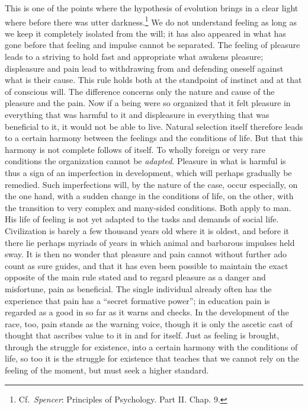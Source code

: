 \documentclass[12pt,a4paper]{book}
\newcommand{\opage}[1]{\marginnote{\footnotesize\textit{[#1]}}}
\begin{document}
This is one of the points where the hypothesis of evolution brings in a
clear light where before there was utter
darkness.\footnote{Cf.\ \emph{Spencer}: Principles of Psychology. Part
II. Chap. 9.} We do not understand feeling as long as we keep it
completely isolated from the will; it has also appeared in what has gone
before that feeling and impulse cannot be separated. The feeling of
pleasure leads to a striving to hold fast and appropriate what awakens
pleasure; displeasure and pain lead to withdrawing from and defending
oneself against what is their cause. This rule holds both at the
standpoint of instinct and at that of conscious will. The difference
\opage{325}concerns only the nature and cause of the pleasure and the
pain. Now if a being were so organized that it felt pleasure in
everything that was harmful to it and displeasure in everything that was
beneficial to it, it would not be able to live. Natural selection itself
therefore leads to a certain harmony between the feelings and the
conditions of life. But that this harmony is not complete follows of
itself. To wholly foreign or very rare conditions the organization
cannot be \emph{adapted}. Pleasure in what is harmful is thus a sign of
an imperfection in development, which will perhaps gradually be
remedied. Such imperfections will, by the nature of the case, occur
especially, on the one hand, with a sudden change in the conditions of
life, on the other, with the transition to very complex and many-sided
conditions. Both apply to man. His life of feeling is not yet adapted to
the tasks and demands of social life. Civilization is barely a few
thousand years old where it is oldest, and before it there lie perhaps
myriads of years in which animal and barbarous impulses held sway. It is
then no wonder that pleasure and pain cannot without further ado count
as sure guides, and that it has even been possible to maintain the
exact opposite of the main rule stated and to regard pleasure as a
danger and misfortune, pain as beneficial. The single individual already
often has the experience that pain has a ``secret formative power''; in
education pain is regarded as a good in so far as it warns and checks.
In the development of the race, too, pain stands as the warning voice,
though it is only the ascetic cast of thought that ascribes value to it
in and for itself. Just as feeling is brought, through the struggle for
existence, into a certain harmony with the conditions of life, so too it
is the struggle for existence that teaches that we cannot rely on the
feeling of the moment, but must seek a higher standard.
\end{document}
